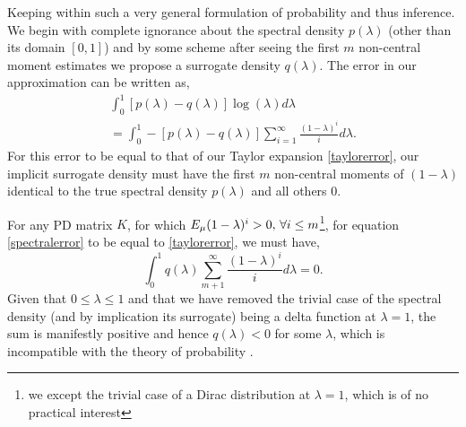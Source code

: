 \documentclass[letterpaper]{article} %
\begin{document}
Keeping within such a very general formulation of probability and thus inference. We begin with complete ignorance about the spectral density $p(\lambda)$ (other than its domain $[0,1]$) and by some scheme after seeing the first $m$ non-central moment estimates we propose a surrogate density $q(\lambda)$. The error in our approximation can be written as,
\begin{eqnarray}
\label{spectralerror}
\int_{0}^{1} [p(\lambda)-q(\lambda)]\log(\lambda)d\lambda \nonumber \\
= \int_{0}^{1} -[p(\lambda)-q(\lambda)]\sum_{i=1}^{\infty}\frac{(1-\lambda)^{i}}{i}d\lambda.
\end{eqnarray}
For this error to be equal to that of our Taylor expansion \eqref{taylorerror}, our implicit surrogate density must have the first $m$ non-central moments of $(1-\lambda)$ identical to the true spectral density $p(\lambda)$ and all others $0$. %

For any PD matrix $K$, for which $E_{\mu}(1-\lambda)^{i} > 0,\thinspace \forall i\leq m$\footnote{we except the trivial case of a Dirac distribution at $\lambda=1$, which is of no practical interest}, for equation \eqref{spectralerror} to be equal to \eqref{taylorerror}, we must have,
\begin{equation}
\int_{0}^{1}q(\lambda)\sum_{m+1}^{\infty}\frac{(1-\lambda)^{i}}{i}d\lambda = 0.
\end{equation}
Given that $ 0 \leq \lambda \leq 1$ and that we have removed the trivial case of the spectral density (and by implication its surrogate) being a delta function at $\lambda = 1$, the sum is manifestly positive and hence $q(\lambda) < 0$ for some $\lambda$, which is incompatible with the theory of probability \cite{finetti,kolmogorov_1950}.  
\end{document}
